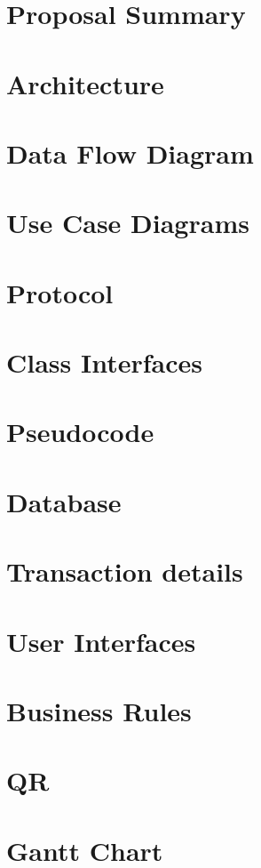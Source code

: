 \chapter{Proposal Summary}


\chapter{Architecture}


\chapter{Data Flow Diagram}


\chapter{Use Case Diagrams}


\chapter{Protocol}


\chapter{Class Interfaces}


\chapter{Pseudocode}


\chapter{Database}


\chapter{Transaction details}


\chapter{User Interfaces}


\chapter{Business Rules}


\chapter{QR}


\chapter{Gantt Chart}

